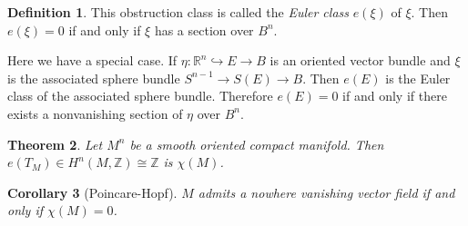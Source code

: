 \documentclass[leqno, openany]{memoir}
\newtheorem{thm}{Theorem}[section]
\newtheorem{cor}[thm]{Corollary}
\theoremstyle{definition}
\newtheorem{defn}[thm]{Definition}
\theoremstyle{remark}
\theoremstyle{plain}
\theoremstyle{definition}
\theoremstyle{remark}
\newcommand{\R}{\mathbb{R}}
\newcommand{\Z}{\mathbb{Z}}
\begin{document}
\begin{defn}
    This obstruction class is called the \textit{Euler class} $e(\xi)$ of $\xi$. Then $e(\xi) = 0$ if and only if $\xi$ has a section over $B^n$.
\end{defn}

Here we have a special case. If $\eta \colon \R^n \hookrightarrow E \to B$ is an oriented vector bundle and $\xi$ is the associated sphere bundle $S^{n-1} \to S(E) \to B$. Then $e(E)$ is the Euler class of the associated sphere bundle. Therefore $e(E) = 0$ if and only if there exists a nonvanishing section of $\eta$ over $B^n$.

\begin{thm}
    Let $M^n$ be a smooth oriented compact manifold. Then $e(T_M) \in H^n(M, \Z) \cong \Z$ is $\chi(M)$.
\end{thm}

\begin{cor}[Poincare-Hopf]
    $M$ admits a nowhere vanishing vector field if and only if $\chi(M) = 0$.
\end{cor}
\end{document}
